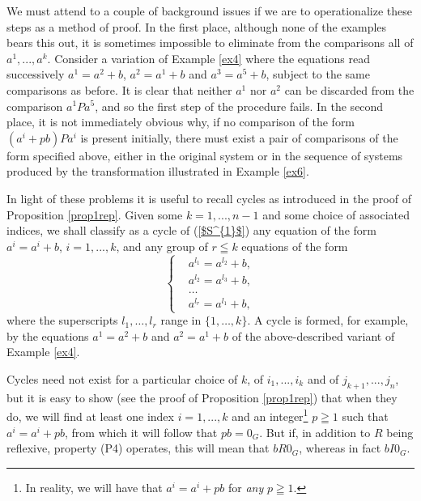 \documentclass[pdflatex,sn-apa,11pt]{sn-jnl}%
\begin{document}
We must attend to a couple of background issues if we are to operationalize these steps as a method of proof. In the first place, although none of the examples bears this out, it is sometimes impossible to eliminate from the comparisons all of $a^1, ..., a^k$. Consider a variation of Example \ref{ex4} where the equations read successively $a^1 = a^2 + b$, $a^2 = a^1 + b$ and $a^3 = a^5 + b$, subject to the same comparisons as before. It is clear that neither $a^1$ nor $a^2$ can be discarded from the comparison $a^1Pa^5$, and so the first step of the procedure fails. In the second place, it is not immediately obvious why, if no comparison of the form $(a^i + pb)Pa^{i}$ is present initially, there must exist a pair of comparisons of the form specified above, either in the original system or in the sequence of systems produced by the transformation illustrated in Example \ref{ex6}.  

In light of these problems it is useful to recall cycles as introduced in the proof of Proposition \ref{prop1rep}. Given some $k = 1, ..., n-1$ and some choice of associated indices, we shall classify as a cycle of (\ref{$S^{1}$}) any equation of the form $a^i = a^i + b$, $i = 1, ..., k$, and any group of $r \leqq k$ equations of the form
\begin{equation*}
  \left\{
    \begin{aligned}
      & a^{l_1} = a^{l_2} + b, \\
      & a^{l_2} = a^{l_3} + b, \\
      & \dots \\
      & a^{l_r} = a^{l_1} + b,
    \end{aligned}
  \right.
\end{equation*}where the superscripts $l_1, \dots, l_r$ range in $\{1, \dots, k\}$. A cycle is formed, for example, by the equations $a^{1} = a^{2} + b$ and $a^2 = a^1 + b$ of the above-described variant of Example \ref{ex4}.

Cycles need not exist for a particular choice of $k$, of $i_1, ..., i_k$ and of $j_{k+1}, ..., j_n$, but it is easy to show (see the proof of Proposition \ref{prop1rep}) that when they do, we will find at least one index $i = 1, ..., k$ and an integer\footnote{In reality, we will have that $a^{i} = a^{i} + pb$ for \textit{any} $p \geqq 1$.} $p \geqq 1$ such that $a^{i} = a^{i} + pb$, from which it will follow that $pb = 0_{G}$. But if, in addition to $R$ being reflexive, property (P4) operates, this will mean that $bR0_{G}$, whereas in fact $bI0_{G}$. 
\end{document}
